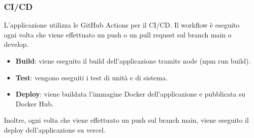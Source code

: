 \documentclass[8pt]{beamer}
\begin{document}
\begin{frame}
    \frametitle{CI/CD}
    L'applicazione utilizza le GitHub Actions per il CI/CD.
    Il workflow è eseguito ogni volta che viene effettuato un push o un pull request sul branch main o develop.
    \begin{itemize}
        \item \textbf{Build}: viene eseguito il build dell'applicazione tramite node (npm run build).
        \item \textbf{Test}: vengono eseguiti i test di unità e di sistema.
        \item \textbf{Deploy}: viene buildata l'immagine Docker dell'applicazione e pubblicata su Docker Hub.
    \end{itemize}
    Inoltre, ogni volta che viene effettuato un push sul branch main, viene eseguito il deploy dell'applicazione su vercel.
\end{frame}
\end{document}
